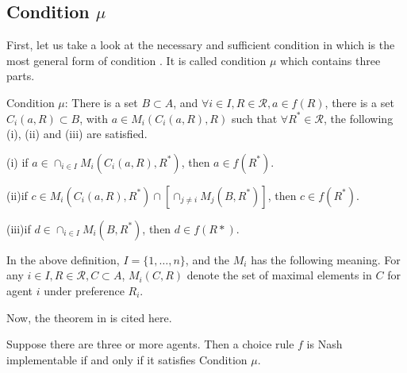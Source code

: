 \subsection{Condition $\mu$}

First, let us take a look at the necessary and sufficient condition
in \parencite{Repullo90} which is the most general form of condition
. It is called condition $\mu$ which contains three parts.
\begin{definition}
  Condition $\mu$: There is a set $B \subset A$, and $\forall i \in I,
  R\in\mathscr{R}, a \in f(R)$, there is a set $C_{i}(a, R) \subset
  B$, with $a \in M_{i}(C_{i}(a,R),R)$ such that $\forall R^* \in
  \mathscr{R}$, the following (i), (ii) and (iii) are satisfied.

(i) if $a \in \cap_{i \in I} M_i(C_i(a, R),R^*)$, then $ a \in f(R^*)$.

(ii)if $c \in M_i(C_i(a, R), R^*) \cap [ \cap_{j \not = i} M_j(B, R^*)]$, then $c \in f(R^*)$.

(iii)if $d \in \cap_{i\in I} M_i(B, R^*)$, then $d \in f(R*)$. 

\end{definition}
In the above definition, $I= \{1,\dots,n\}$, and the $M_{i}$ has the following meaning. For
any $i \in I, R \in \mathscr{R}, C \subset A$, $M_{i}(C, R)$ denote
the set  of maximal  elements  in $C$ for  agent  $i$  under  preference $R_{i}$.

Now, the theorem in \parencite{Repullo90} is cited here.

\begin{thm}
\label{mu}
  Suppose there are three or more agents. Then a choice rule $f$ is Nash implementable if and only if it satisfies Condition $\mu$.
\end{thm}

